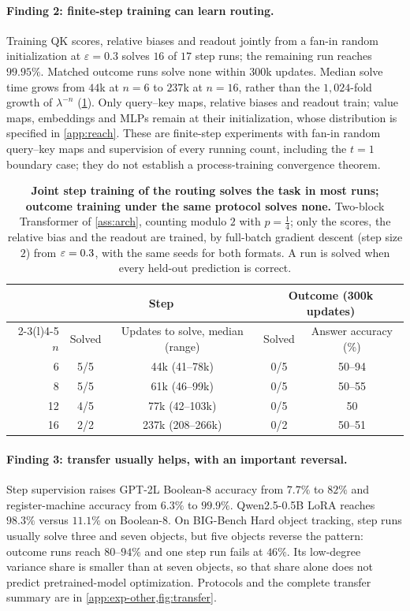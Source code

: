 \paragraph{Finding 2: finite-step training can learn routing.}
Training QK scores, relative biases and readout jointly from a fan-in random initialization
at $\varepsilon=0.3$ solves $16$ of $17$ step runs; the remaining run reaches $99.95\%$.
Matched outcome runs solve none within $300$k updates. Median solve time grows from
$44$k at $n=6$ to $237$k at $n=16$, rather than the $1{,}024$-fold growth of $\lambda^{-n}$
(\cref{tab:reach}). Only query--key maps, relative biases and readout train;
value maps, embeddings and MLPs remain at their initialization, whose distribution is specified
in \cref{app:reach}. These are finite-step experiments with fan-in random query--key
maps and supervision of every running count, including the $t=1$ boundary case;
they do not establish a process-training convergence theorem.

\begin{table}[t]
\caption{\textbf{Joint step training of the routing solves the task in most runs; outcome training under the same protocol solves
none.} Two-block Transformer of \cref{ass:arch}, counting modulo $2$ with $p=\tfrac{1}{4}$; only the scores, the relative bias and the
readout are trained, by full-batch gradient descent (step size $2$) from $\varepsilon=0.3$, with the same seeds for both formats. A run is
solved when every held-out prediction is correct.}
\label{tab:reach}
\centering\small
\begin{tabular}{@{}rcccc@{}}
\toprule
 & \multicolumn{2}{c}{Step} & \multicolumn{2}{c}{Outcome (300k updates)}\\
\cmidrule(lr){2-3}\cmidrule(l){4-5}
$n$ & Solved & Updates to solve, median (range) & Solved & Answer accuracy (\%)\\
\midrule
6  & 5/5 & 44k (41--78k)   & 0/5 & 50--94\\
8  & 5/5 & 61k (46--99k)   & 0/5 & 50--55\\
12 & 4/5 & 77k (42--103k)  & 0/5 & 50\\
16 & 2/2 & 237k (208--266k) & 0/2 & 50--51\\
\bottomrule
\end{tabular}
\end{table}

\paragraph{Finding 3: transfer usually helps, with an important reversal.}
Step supervision raises GPT-2L Boolean-8 accuracy from $7.7\%$ to $82\%$ and register-machine
accuracy from $6.3\%$ to $99.9\%$. Qwen2.5-0.5B LoRA reaches $98.3\%$ versus $11.1\%$
on Boolean-8. On BIG-Bench Hard object tracking, step runs usually solve three and seven
objects, but five objects reverse the pattern: outcome runs reach $80$--$94\%$ and one
step run fails at $46\%$. Its low-degree variance share is smaller than at seven objects,
so that share alone does not predict pretrained-model optimization. Protocols and the
complete transfer summary are in \cref{app:exp-other,fig:transfer}.

